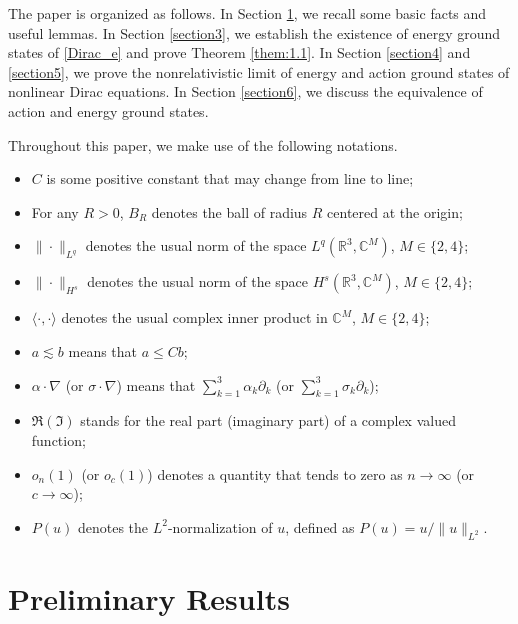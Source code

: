 \documentclass{amsart}
\theoremstyle{plain}
\theoremstyle{definition}
\theoremstyle{remark}
\numberwithin{equation}{section} \numberwithin{figure}{section}
\begin{document}
 The paper is organized as follows. 
In Section \ref{section2}, we recall some basic facts and useful lemmas. 
In Section \ref{section3}, we establish the existence of energy ground states of \eqref{Dirac_e} and prove Theorem \ref{them:1.1}. 
In Section \ref{section4} and \ref{section5}, we prove the nonrelativistic limit of 
energy and action ground states of nonlinear Dirac equations.
In Section \ref{section6}, we discuss the equivalence of action and energy ground states.
\medskip

 Throughout this paper, we make use of the following notations.
\begin{itemize}
\item $  C  $ is some positive constant that may change from line to line;
 \item For any $R>0$, $B_R$ denotes the ball of radius $R$ centered at the origin;
    \item $\|\cdot\|_{L^q}$ denotes the usual norm of the space $L^q\left(\mathbb{R}^3, \mathbb{C}^M\right)$, $M\in \{2,4\}$;
    \item $\|\cdot\|_{H^s}$ denotes the usual norm of the space $H^s\left(\mathbb{R}^3, \mathbb{C}^M\right)$, $M\in \{2,4\}$;
\item %
$\langle \cdot,\cdot\rangle$
denotes the usual complex inner product in $\mathbb{C}^M$, $M\in \{2,4\}$;
\item  $a\lesssim  b$ means that $a \leq     C   b$;
\item $\alpha\cdot\nabla$ (or $\sigma\cdot\nabla$) means that $\sum\limits_{k=1}^3 \alpha_k\partial_k$ (or $\sum\limits_{k=1}^3 \sigma_k\partial_k$);
\item $\Re(\Im)$ stands for the real part (imaginary part) of a  complex valued function;
\item $o_n(1)$ (or $o_c(1)$)   denotes a quantity that tends to zero as $n\to \infty$ (or $c\to \infty$);
\item $P(u)$ denotes the $L^2$-normalization of $u$, defined as $P(u) = u / \|u\|_{L^2}$.
    \end{itemize}






\section{Preliminary Results}\label{section2}
\end{document}
